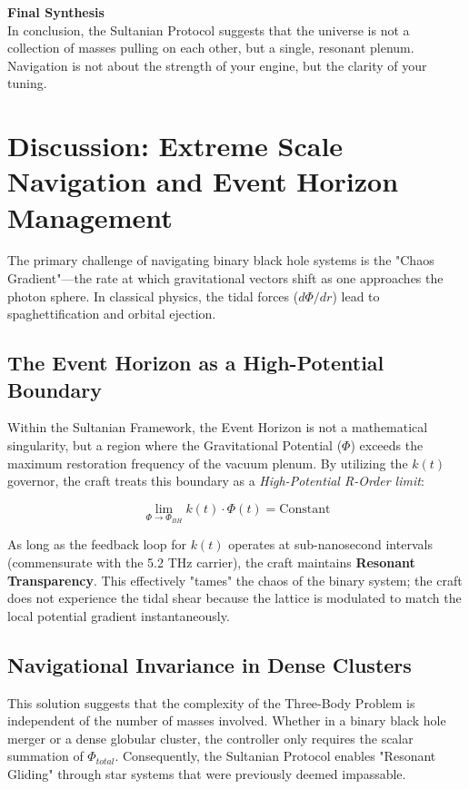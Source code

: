\documentclass[11pt]{article}
\begin{document}
\textbf{Final Synthesis}\\
In conclusion, the Sultanian Protocol suggests that the universe is not a collection of masses pulling on each other, but a single, resonant plenum. Navigation is not about the strength of your engine, but the clarity of your tuning.

\section{Discussion: Extreme Scale Navigation and Event Horizon Management}

The primary challenge of navigating binary black hole systems is the "Chaos Gradient"—the rate at which gravitational vectors shift as one approaches the photon sphere. In classical physics, the tidal forces ($d\Phi/dr$) lead to spaghettification and orbital ejection. 

\subsection{The Event Horizon as a High-Potential Boundary}
Within the Sultanian Framework, the Event Horizon is not a mathematical singularity, but a region where the Gravitational Potential ($\Phi$) exceeds the maximum restoration frequency of the vacuum plenum. By utilizing the $k(t)$ governor, the craft treats this boundary as a \textit{High-Potential R-Order limit}:

\begin{equation}
    \lim_{\Phi \to \Phi_{BH}} k(t) \cdot \Phi(t) = \text{Constant}
\end{equation}

As long as the feedback loop for $k(t)$ operates at sub-nanosecond intervals (commensurate with the 5.2 THz carrier), the craft maintains \textbf{Resonant Transparency}. This effectively "tames" the chaos of the binary system; the craft does not experience the tidal shear because the lattice is modulated to match the local potential gradient instantaneously.

\subsection{Navigational Invariance in Dense Clusters}
This solution suggests that the complexity of the Three-Body Problem is independent of the number of masses involved. Whether in a binary black hole merger or a dense globular cluster, the controller only requires the scalar summation of $\Phi_{total}$. Consequently, the Sultanian Protocol enables "Resonant Gliding" through star systems that were previously deemed impassable.
\end{document}
